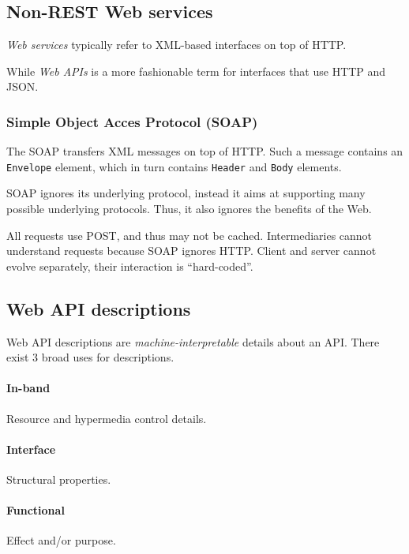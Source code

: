 \documentclass{report}
\begin{document}
\subsection{Non-REST Web services}

\emph{Web services} typically refer to XML-based interfaces
on top of HTTP.

While \emph{Web APIs} is a more fashionable term
for interfaces that use HTTP and JSON.

\subsubsection{Simple Object Acces Protocol (SOAP)}

The SOAP transfers XML messages on top of HTTP.
Such a message contains an \texttt{Envelope} element,
which in turn contains \texttt{Header} and \texttt{Body} elements.

SOAP ignores its underlying protocol,
instead it aims at supporting many possible underlying protocols.
Thus, it also ignores the benefits of the Web.

All requests use POST, and thus may not be cached.
Intermediaries cannot understand requests because SOAP ignores HTTP.
Client and server cannot evolve separately,
their interaction is ``hard-coded''.

\subsection{Web API descriptions}

Web API descriptions are \emph{machine-interpretable} details about an API.
There exist 3 broad uses for descriptions.

\paragraph{In-band}

Resource and hypermedia control details.

\paragraph{Interface}

Structural properties.

\paragraph{Functional}

Effect and/or purpose.
\end{document}
